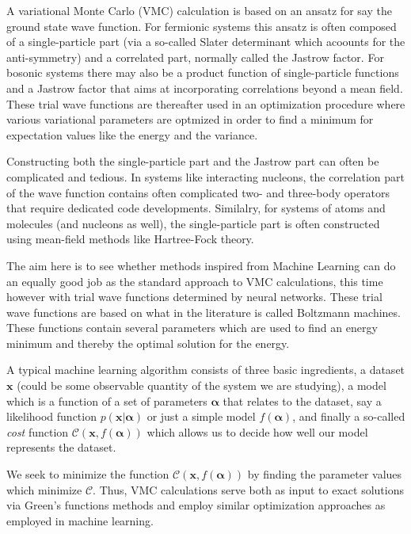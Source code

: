 \documentclass[10pt]{article}
\begin{document}
A variational Monte Carlo (VMC) calculation is based on an ansatz for
say the ground state wave function.  For fermionic systems this ansatz
is often composed of a single-particle part (via a so-called Slater
determinant which acoounts for the anti-symmetry) and a correlated
part, normally called the Jastrow factor.  For bosonic systems there
may also be a product function of single-particle functions and a
Jastrow factor that aims at incorporating correlations beyond a mean
field.  These trial wave functions are thereafter used in an
optimization procedure where various variational parameters are
optmized in order to find a minimum for expectation values like the
energy and the variance.

Constructing both the single-particle part and the Jastrow part can
often be complicated and tedious.  In systems like interacting
nucleons, the correlation part of the wave function contains often
complicated two- and three-body operators that require dedicated code
developments. Similalry, for systems of atoms and molecules (and
nucleons as well), the single-particle part is often constructed using
mean-field methods like Hartree-Fock theory.

The aim here is to see whether methods inspired from Machine Learning
can do an equally good job as the standard approach to VMC
calculations, this time however with trial wave functions determined
by neural networks.  These trial wave functions 
are based on what in the literature is called Boltzmann
machines. These functions contain several parameters which are used to
find an energy minimum and thereby the optimal solution for the
energy.

A typical machine learning algorithm consists of three basic
ingredients, a dataset $\mathbf{x}$ (could be some observable quantity
of the system we are studying), a model which is a function of a set
of parameters $\mathbf{\alpha}$ that relates to the dataset, say a
likelihood function $p(\mathbf{x}\vert \mathbf{\alpha})$ or just a
simple model $f(\mathbf{\alpha})$, and finally a so-called {\em cost}
function $\mathcal{C} (\mathbf{x}, f(\mathbf{\alpha}))$ which allows
us to decide how well our model represents the dataset.

We seek to minimize the function $\mathcal{C} (\mathbf{x},
f(\mathbf{\alpha}))$ by finding the parameter values which minimize
$\mathcal{C}$. Thus, VMC calculations serve both as input to exact
solutions via Green's functions methods and employ similar
optimization approaches as employed in machine learning.  
\end{document}
